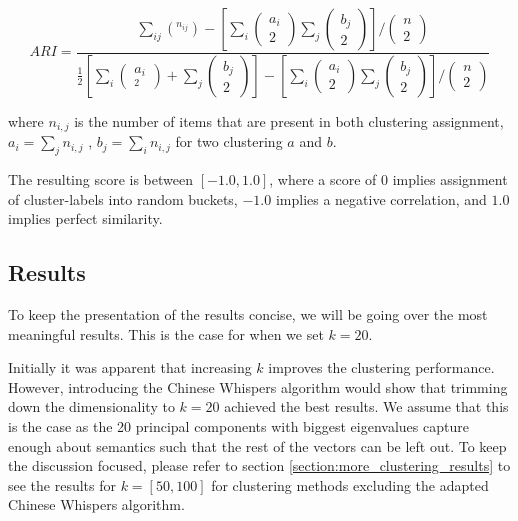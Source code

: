 \documentclass[a4paper,12pt,oneside,openright]{report}
\begin{document}
\begin{equation}
A R I=\frac{\sum_{i j}\left(^{n_{i j}}\right)-\left[\sum_{i}\left(\begin{array}{c}a_{i} \\ 2\end{array}\right) \sum_{j}\left( \begin{array}{c}b_{j} \\ 2\end{array} \right)\right] /\left(\begin{array}{c}n \\ 2\end{array}\right)}{\frac{1}{2}\left[\sum_{i}\left(\begin{array}{c}a_{i} \\ _{2}\end{array}\right)+\sum_{j}\left(\begin{array}{l}b_{j} \\ 2\end{array}\right)\right]-\left[\sum_{i}\left(\begin{array}{c} a_{i} \\ 2\end{array}\right) \sum_{j}\left(\begin{array}{l}b_{j} \\ 2\end{array}\right)\right] /\left(\begin{array}{l}n \\ 2\end{array}\right)}
\end{equation}{\label{eq:adjustedrandomindex}}

where $n_{i,j}$ is the number of items that are present in both clustering assignment, $a_i = \sum_j n_{i,j}$ , $b_j = \sum_i n_{i,j}$ for two clustering $a$ and $b$.

The resulting score is between $[-1.0, 1.0]$, where a score of $0$ implies assignment of cluster-labels into random buckets, $-1.0$ implies a negative correlation, and $1.0$ implies perfect similarity.

\subsection{Results}

To keep the presentation of the results concise, we will be going over the most meaningful results.
This is the case for when we set $k=20$.

Initially it was apparent that increasing $k$ improves the clustering performance.
However, introducing the Chinese Whispers algorithm would show that trimming down the dimensionality to $k=20$ achieved the best results.
We assume that this is the case as the 20 principal components with biggest eigenvalues capture enough about semantics such that the rest of the vectors can be left out.
To keep the discussion focused, please refer to section \eqref{section:more_clustering_results} to see the results for $k=[50, 100]$ for clustering methods excluding the adapted Chinese Whispers algorithm.
\end{document}
